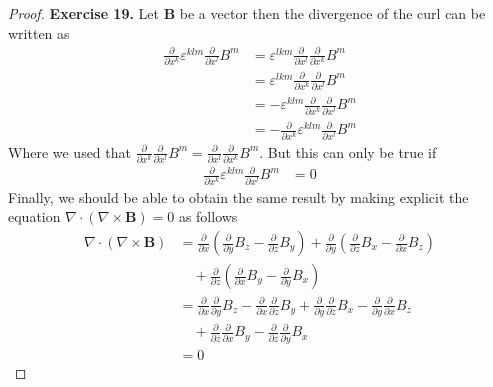 \documentclass[11pt]{article}
\theoremstyle{definition}
\begin{document}
\begin{proof}{\textbf{Exercise 19.}}
    Let $\bm B$ be a vector then the divergence of the curl can be written as
    \begin{align*}
        \frac{\partial}{\partial x^k}\varepsilon^{klm}
        \frac{\partial}{\partial x^l} B^m
        &= \varepsilon^{lkm} \frac{\partial}{\partial x^l}
        \frac{\partial}{\partial x^k} B^m\\
        &= \varepsilon^{lkm} \frac{\partial}{\partial x^k}
        \frac{\partial}{\partial x^l} B^m\\
        &= -\varepsilon^{klm}\frac{\partial}{\partial x^k}
        \frac{\partial}{\partial x^l} B^m\\
        &= -\frac{\partial}{\partial x^k}\varepsilon^{klm}
        \frac{\partial}{\partial x^l} B^m
    \end{align*}
    Where we used that
    $\frac{\partial}{\partial x^k} \frac{\partial }{\partial x^l}B^m 
    = \frac{\partial}{\partial x^l} \frac{\partial }{\partial x^k} B^m$.
    But this can only be true if 
    \begin{align*}
        \frac{\partial}{\partial x^k}\varepsilon^{klm}
        \frac{\partial}{\partial x^l} B^m &= 0 
    \end{align*}
    Finally, we should be able to obtain the same result by making explicit
    the equation $\nabla \cdot (\nabla \times \bm{B}) = 0$ as follows
    \begin{align*}
        \nabla \cdot (\nabla \times \bm{B}) &=
        \frac{\partial}{\partial x} \left(
            \frac{\partial}{\partial y}B_z
            - \frac{\partial}{\partial z}B_y
        \right)
        + \frac{\partial}{\partial y} \left(
            \frac{\partial}{\partial z}B_x
            - \frac{\partial}{\partial x}B_z
        \right)\\
        &\quad + \frac{\partial}{\partial z} \left(
            \frac{\partial}{\partial x}B_y
            - \frac{\partial}{\partial y}B_x
        \right)\\
        &= \frac{\partial}{\partial x}\frac{\partial}{\partial y}B_z
            - \frac{\partial}{\partial x}\frac{\partial}{\partial z}B_y
        + \frac{\partial}{\partial y}\frac{\partial}{\partial z}B_x
            - \frac{\partial}{\partial y}\frac{\partial}{\partial x}B_z
        \\
        &\quad + \frac{\partial}{\partial z}\frac{\partial}{\partial x}B_y
            - \frac{\partial}{\partial z}\frac{\partial}{\partial y}B_x
        \\
        &= 0
    \end{align*}
\end{proof}
\end{document}
